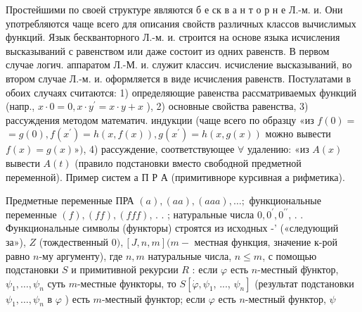 \documentclass[10pt]{article}
\begin{document}
Простейшими по своей структуре являются б е ск в а н т о р н е Л.-м. и. Они употребляются чаще всего для описания свойств различных классов вычислимых функций. Язык бескванторного Л.-м. и. строится на основе языка исчисления высказываний с равенством или даже состоит из одних равенств. В первом случае логич. аппаратом Л.-М. и. служит классич. исчисление высказываний, во втором случае Л.-м. и. оформляется в виде исчисления равенств. Постулатами в обоих случаях считаются: 1) определяющие равенства рассматриваемых функций (напр., $x \cdot 0=0, x \cdot y^{\prime}=x \cdot y+x$ ), 2) основные свойства равенства, 3) рассуждения методом математич. индукции (чаще всего по образцу «из $f(0)=$ $=g(0), f\left(x^{\prime}\right)=h(x, f(x)), g\left(x^{\prime}\right)=h(x, g(x))$ можно вывести $f(x)=g(x) »)$, 4) рассуждение, соответствующее $\forall$ удалению: «из $A(x)$ вывести $A(t)$ (правило подстановки вместо свободной предметной переменной). Пример систем а П Р А (примитивноре курсивная а рифметика).



Предметные переменные ПРА $(a),(a a),(a a a), \ldots ;$ функциональные переменные $(f),(f f),(f f f)$, . . ; натуральные числа $0,0^{\prime}, 0^{\prime \prime}$, . . Функциональные символы (функторы) строятся из исходных -' («следующий за»), $Z$ (тождественный 0$),[J, n, m](m-$ местная функция, значение к-рой равно $n$-му аргументу), где $n, m$ натуральные числа, $n \leqslant m$, с помощью подстановки $S$ и примитивной рекурсии $R$ : если $\varphi$ есть $n$-местный ф̆унктор, $\psi_{1}, \ldots, \psi_{n}$ суть $m$-местные функторы, то $S\left[\dot{\varphi}, \psi_{1}\right.$, ..., $\left.\psi_{n}\right]$ (результат подстановки $\psi_{1}, \ldots, \psi_{n}$ в $\varphi$ ) есть $m$-местный функтор; если $\varphi$ есть $n$-местный функтор, $\psi$
\end{document}
